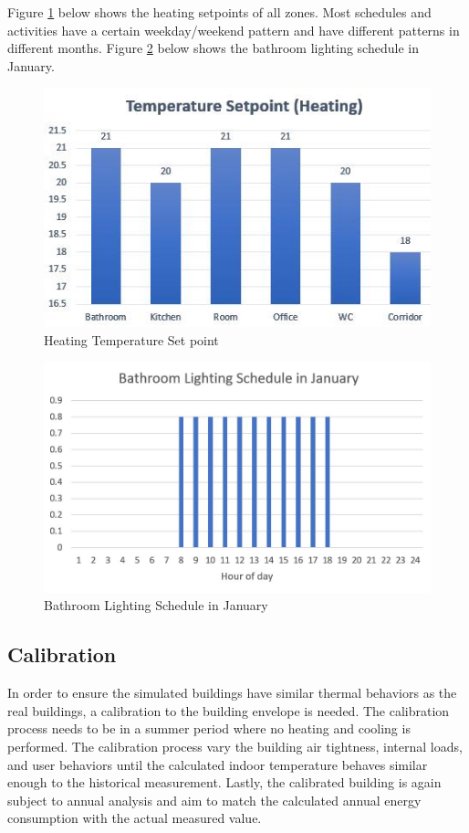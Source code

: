 \documentclass[11pt, a4paper]{article}
\theoremstyle{definition}
\begin{document}
			Figure \ref{fig:HeatingSP} below shows the heating setpoints of all zones. Most schedules and activities have a certain weekday/weekend pattern and have different patterns in different months. Figure \ref{fig:JanBathLight} below shows the bathroom lighting schedule in January.\\
			
			\begin{figure}[H]
			\centering
			\includegraphics[scale=1]{TempSetpoint.jpg}
			\caption{Heating Temperature Set point}
			\label{fig:HeatingSP}
			\end{figure}
			

			\begin{figure}[h!]
			\centering
			\includegraphics[scale=0.4]{JanBath_Light.jpg}
			\caption{Bathroom Lighting Schedule in January}
			\label{fig:JanBathLight}
			\end{figure}
			



	\subsection{Calibration}
		In order to ensure the simulated buildings have similar thermal behaviors as the real buildings, a calibration to the building envelope is needed. The calibration process needs to be in a summer period where no heating and cooling is performed. The calibration process vary the building air tightness, internal loads, and user behaviors until the calculated indoor temperature behaves similar enough to the historical measurement. Lastly, the calibrated building is again subject to annual analysis and aim to match the calculated annual energy consumption with the actual measured value.
		
\end{document}
